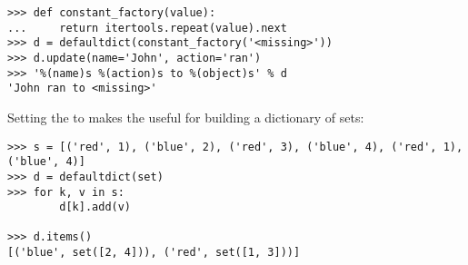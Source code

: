 \begin{verbatim}
>>> def constant_factory(value):
...     return itertools.repeat(value).next
>>> d = defaultdict(constant_factory('<missing>'))
>>> d.update(name='John', action='ran')
>>> '%(name)s %(action)s to %(object)s' % d
'John ran to <missing>'
\end{verbatim}

Setting the  to  makes the
 useful for building a dictionary of sets:

\begin{verbatim}
>>> s = [('red', 1), ('blue', 2), ('red', 3), ('blue', 4), ('red', 1), ('blue', 4)]
>>> d = defaultdict(set)
>>> for k, v in s:
        d[k].add(v)

>>> d.items()
[('blue', set([2, 4])), ('red', set([1, 3]))]
\end{verbatim}
